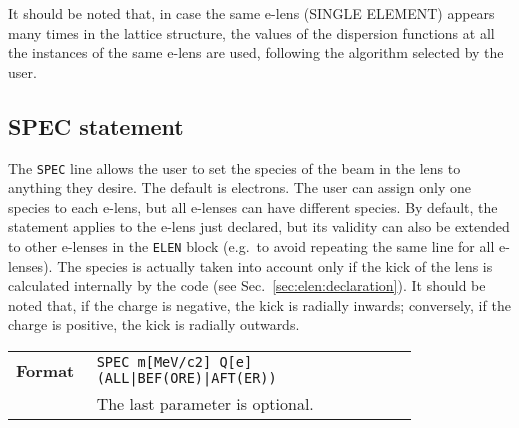 \bigskip
\noindent It should be noted that, in case the same e-lens (SINGLE ELEMENT) appears many times in the lattice structure, the values of the dispersion functions at all the instances of the same e-lens are used, following the algorithm selected by the user.

\subsection{SPEC statement}\label{sec:elen:SPEC}
The \texttt{SPEC} line allows the user to set the species of the beam in the lens to anything they desire.
The default is electrons.
The user can assign only one species to each e-lens, but all e-lenses can have different species.
By default, the statement applies to the e-lens just declared, but its validity can also be extended to other e-lenses in the \texttt{ELEN} block (e.g.~to avoid repeating the same line for all e-lenses).
The species is actually taken into account only if the kick of the lens is calculated internally by the code (see Sec.~\ref{sec:elen:declaration}).
It should be noted that, if the charge is negative, the kick is radially inwards; conversely, if the charge is positive, the kick is radially outwards.

\bigskip
\begin{tabular}{@{}lp{0.8\linewidth}}
    \textbf{Format}     & \texttt{SPEC  m[MeV/c2]  Q[e] (ALL|BEF(ORE)|AFT(ER))} \\
    & The last parameter is optional.  \\
\end{tabular}

